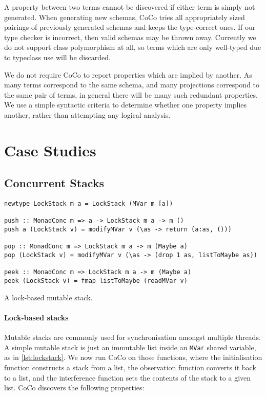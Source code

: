 A property between two terms cannot be discovered if either term is
simply not generated.  When generating new schemas, CoCo tries all
appropriately sized pairings of previously generated schemas and keeps
the type-correct ones.  If our type checker is incorrect, then valid
schemas may be thrown away.  Currently we do not support class
polymorphism at all, so terms which are only well-typed due to
typeclass use will be discarded.

We do not require CoCo to report properties which are implied by
another.  As many terms correspond to the same schema, and many
projections correspond to the same pair of terms, in general there
will be many such redundant properties.  We use a simple syntactic
criteria to determine whether one property implies another, rather
than attempting any logical analysis.

\section{Case Studies}
\label{sec:coco-cases}

\subsection*{Concurrent Stacks}
\label{sec:coco-cases-stack}

\begin{listing}
\begin{verbatim}
newtype LockStack m a = LockStack (MVar m [a])

push :: MonadConc m => a -> LockStack m a -> m ()
push a (LockStack v) = modifyMVar v (\as -> return (a:as, ()))

pop :: MonadConc m => LockStack m a -> m (Maybe a)
pop (LockStack v) = modifyMVar v (\as -> (drop 1 as, listToMaybe as))

peek :: MonadConc m => LockStack m a -> m (Maybe a)
peek (LockStack v) = fmap listToMaybe (readMVar v)
\end{verbatim}
\caption{A lock-based mutable stack.}
\label{lst:lockstack}
\end{listing}

\paragraph{Lock-based stacks}
Mutable stacks are commonly used for synchronisation amongst multiple
threads.  A simple mutable stack is just an immutable list inside an
\verb|MVar| shared variable, as in \cref{lst:lockstack}.  We now run
CoCo on those functions, where the initialisation function constructs
a stack from a list, the observation function converts it back to a
list, and the interference function sets the contents of the stack to
a given list.  CoCo discovers the following properties:

